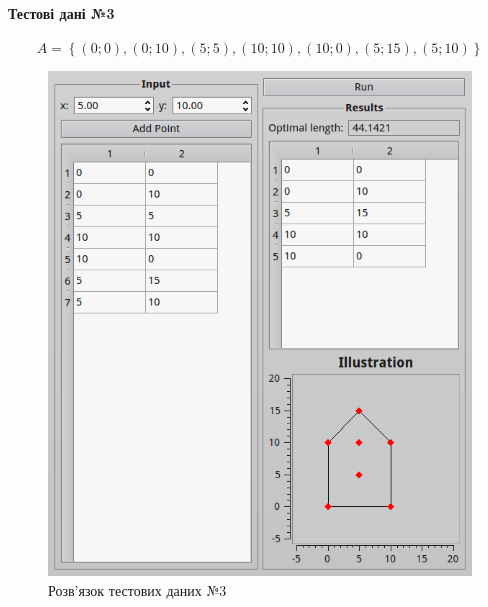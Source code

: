\documentclass[utf8,ukrainian]{eskdtext}
\begin{document}
\paragraph{Тестові дані №3}
\begin{equation}
  A = \left\{ \left( 0; 0 \right), \left( 0; 10 \right), \left( 5; 5
  \right), \left( 10; 10 \right), \left( 10; 0 \right), \left( 5; 15
\right), \left( 5; 10 \right) \right\}
  \label{eq:t3}
\end{equation}
\begin{figure}[h!]
  \centering
  \includegraphics[scale=0.65]{scr3.png}
  \caption{Розв’язок тестових даних №3}
  \label{fig:f3}
\end{figure}
\end{document}
